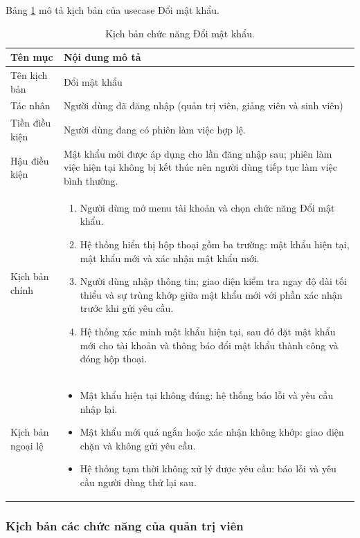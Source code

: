\documentclass[../BTL.tex]{subfiles}
\begin{document}
Bảng \ref{tab:uc-doi-mat-khau} mô tả kịch bản của usecase Đổi mật khẩu.
\begin{table}[H]
\centering
\begin{tabularx}{\textwidth}{|p{3.2cm}|X|}
\hline
Tên mục & Nội dung mô tả \\ \hline
Tên kịch bản & Đổi mật khẩu \\ \hline
Tác nhân & Người dùng đã đăng nhập (quản trị viên, giảng viên và sinh viên) \\ \hline
Tiền điều kiện & Người dùng đang có phiên làm việc hợp lệ. \\ \hline
Hậu điều kiện & Mật khẩu mới được áp dụng cho lần đăng nhập sau; phiên làm việc hiện tại không bị kết thúc nên người dùng tiếp tục làm việc bình thường. \\ \hline
Kịch bản chính &
\begin{enumerate}[leftmargin=*, nosep]
    \item Người dùng mở menu tài khoản và chọn chức năng Đổi mật khẩu.
    \item Hệ thống hiển thị hộp thoại gồm ba trường: mật khẩu hiện tại, mật khẩu mới và xác nhận mật khẩu mới.
    \item Người dùng nhập thông tin; giao diện kiểm tra ngay độ dài tối thiểu và sự trùng khớp giữa mật khẩu mới với phần xác nhận trước khi gửi yêu cầu.
    \item Hệ thống xác minh mật khẩu hiện tại, sau đó đặt mật khẩu mới cho tài khoản và thông báo đổi mật khẩu thành công và đóng hộp thoại.
\end{enumerate} \\ \hline
Kịch bản ngoại lệ &
\begin{itemize}[leftmargin=*, nosep]
    \item Mật khẩu hiện tại không đúng: hệ thống báo lỗi và yêu cầu nhập lại.
    \item Mật khẩu mới quá ngắn hoặc xác nhận không khớp: giao diện chặn và không gửi yêu cầu.
    \item Hệ thống tạm thời không xử lý được yêu cầu: báo lỗi và yêu cầu người dùng thử lại sau.
\end{itemize} \\ \hline
\end{tabularx}
\caption{Kịch bản chức năng Đổi mật khẩu.}
\label{tab:uc-doi-mat-khau}
\end{table}

\subsubsection{Kịch bản các chức năng của quản trị viên}
\end{document}
